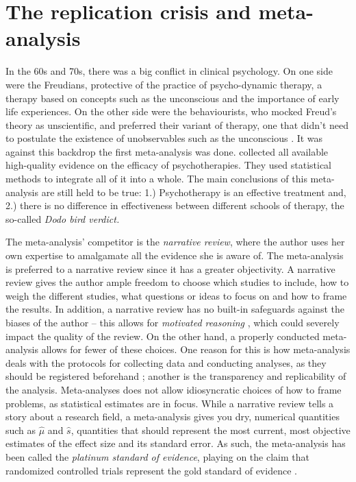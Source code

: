 \section{The replication crisis and meta-analysis}

In the 60s and 70s, there was a big conflict in clinical psychology. On one side were the Freudians, protective of the practice of psycho-dynamic therapy, a therapy based on concepts such as the unconscious and the importance of early life experiences. On the other side were the behaviourists, who mocked Freud's theory as unscientific, and preferred their variant of therapy, one that didn't need to postulate the existence of unobservables such as the unconscious \parencite[Chapter 4]{Wampold2019-fe}. It was against this backdrop the first meta-analysis was done. \textcite{Smith1977-vw} collected all available high-quality evidence on the efficacy of psychotherapies. They used statistical methods to integrate all of it into a whole. The main conclusions of this meta-analysis are still held to be true: 1.) Psychotherapy is an effective treatment and, 2.) there is no difference in effectiveness between different schools of therapy, the so-called \emph{Dodo bird verdict.}

The meta-analysis' competitor is the \emph{narrative review}, where the author uses her own expertise to amalgamate all the evidence she is aware of. The meta-analysis is preferred to a narrative review since it has a greater objectivity. A narrative review gives the author ample freedom to choose which studies to include, how to weigh the different studies, what questions or ideas to focus on and how to frame the results. In addition, a narrative review has no built-in safeguards against the biases of the author -- this allows for \emph{motivated reasoning} \parencite{Kunda1990-ry}, which could severely impact the quality of the review. On the other hand, a properly conducted meta-analysis allows for fewer of these choices. One reason for this is how meta-analysis deals with the protocols for collecting data and conducting analyses, as they should be registered beforehand \parencite{Egger1997-ue}; another is the transparency and replicability of the analysis. Meta-analyses does not allow idiosyncratic choices of how to frame problems, as statistical estimates are in focus. While a narrative review tells a story about a research field, a meta-analysis gives you dry, numerical quantities such as $\widehat{\mu}$ and $\widehat{s}$, quantities that should represent the most current, most objective estimates of the effect size and its standard error. As such, the meta-analysis has been called the \emph{platinum standard of evidence}, playing on the claim that randomized controlled trials represent the gold standard of evidence \parencite{Stegenga2011-zo}.

